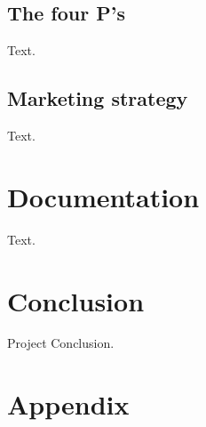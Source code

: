 \documentclass[12p]{article}
\begin{document}
\subsection{The four P's} \label{TheFourPs}

Text.

\newpage


\subsection{Marketing strategy} \label{MarketingStrategy}

Text.


\newpage
\section{Documentation}

Text.


\newpage
\section{Conclusion}

Project Conclusion.


\newpage
\printbibliography[heading=bibintoc,title={References}]


\newpage
\appendix
\section{Appendix}

\end{document}
